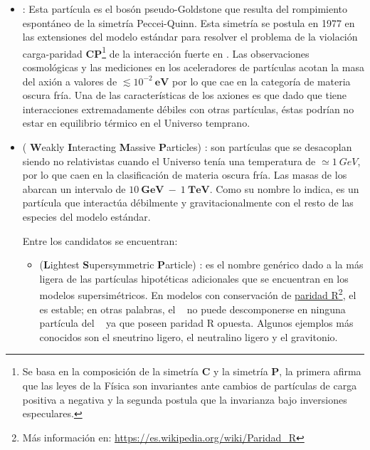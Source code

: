 \begin{itemize}
\item \textbf{\Axiones}%
: Esta partícula es el bosón pseudo-Goldstone que resulta del rompimiento espontáneo de la simetría Peccei-Quinn. Esta simetría se postula en 1977 en las extensiones del modelo estándar para resolver el problema de la violación carga-paridad \textbf{CP}\footnote{Se basa en la composición de la simetría \textbf{C} y la simetría \textbf{P}, la primera afirma que las leyes de la Física son invariantes  ante cambios de partículas de carga positiva a negativa y la segunda postula que la invarianza bajo inversiones especulares. } de la interacción fuerte en \QCD. Las observaciones cosmológicas y las mediciones en los aceleradores de partículas acotan la masa del axión a valores de $\lesssim 10^{-2}~\mathbf{eV}$ por lo que cae en la categoría de materia oscura fría. Una de las características de los axiones es que dado que tiene interacciones extremadamente débiles con otras partículas, éstas podrían no estar en equilibrio térmico en el Universo temprano. 

\item \WIMPs ( \textbf{W}eakly \textbf{I}nteracting \textbf{M}assive \textbf{P}articles) %
: son partículas que se desacoplan siendo no relativistas cuando el Universo tenía una temperatura de $\simeq 1~ GeV$, por lo que caen en la clasificación de materia oscura fría. Las masas
de los \WIMPs ~ abarcan un intervalo de $10 ~ \mathbf{GeV} ~ - ~ 1 ~ \mathbf{TeV}$. Como su nombre lo indica, es un partícula que interactúa débilmente y gravitacionalmente con el resto de las especies del modelo estándar. 



Entre los candidatos se encuentran:
\begin{itemize}
\item 	\LSP (\textbf{L}ightest \textbf{S}upersymmetric \textbf{P}article)%
: es el nombre genérico dado a la más ligera de las partículas hipotéticas adicionales que se encuentran en los modelos supersimétricos. En modelos con conservación de \href{https://es.wikipedia.org/wiki/Paridad\_R}{paridad R}\footnote{{Más información en: \href{https://es.wikipedia.org/wiki/Paridad\_R}{https://es.wikipedia.org/wiki/Paridad\_R}}}, el \LSP ~ es estable; en otras palabras, el \LSP ~ no puede descomponerse en ninguna partícula del \ME~ ya que poseen paridad R opuesta. Algunos ejemplos más conocidos son el sneutrino ligero, el neutralino ligero y el gravitonio.


\end{itemize}
\end{itemize}
